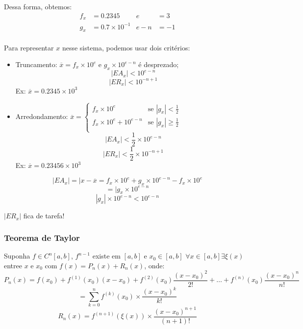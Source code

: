 \documentclass{article}
\begin{document}
            Dessa forma, obtemos:
            \begin{align*}
                f_x &= 0.2345               &               e &= 3\\
                g_x &= 0.7 \times 10^{-1}   &               e-n &= -1\\
            \end{align*}


            Para representar $x$ nesse sistema, podemos usar dois critérios:
            \begin{itemize}
                \item Truncamento: $\overline{x} = f_x \times 10^e$ e $g_x \times 10^{e-n}$ é desprezado;\\
                    \[|EA_x| < 10^{e-n}\]
                    \[|ER_x| < 10^{-n+1}\]
                    Ex: $\overline{x} = 0.2345 \times 10^3$
                \item Arredondamento: $\overline{x} = \begin{cases}
                        f_x  \times 10^e & \text{se $|g_x| < \frac{1}{2}$}\\
                        f_x  \times 10^e  + 10^{e - n} & \text{se $|g_x| \geq \frac{1}{2}$}\\
                    \end{cases}$\\
                    \[|EA_x| < \frac{1}{2} \times 10^{e-n}\]
                    \[|ER_x| < \frac{1}{2} \times 10^{-n+1}\]
                    Ex: $\overline{x} = 0.23456 \times 10^3$
            \end{itemize}

            \[|EA_x| = |x - \overline{x} = f_x \times 10^e + g_x \times 10^{e-n} - f_x \times 10^e\]
            \[= |g_x \times 10^{e-n}\]
            \[|g_x| \times 10^{e-n} < 10^{e-n}\]


            $|ER_x|$ fica de tarefa!

        \subsubsection{Teorema de Taylor}

            Suponha $f \in C^n[a,b]$, $f^{n-1}$ existe em $[a,b]$ e $x_0 \in [a,b]$
            $\forall x \in [a,b] \exists \xi(x)$ entree $x$ e $x_0$ com
            $f(x) = P_n(x) + R_n(x)$, onde:
            \[P_n(x) = f(x_0) + f^{(1)}(x_0)(x - x_0) + f^{(2)}(x_0)\frac{(x-x_0)^2}{2!} + \ldots + f^{(n)}(x_0)\frac{(x-x_0)^n}{n!}\]
            \[= \sum_{k=0}^{n} f^{(k)}(x_0) \times \frac{{(x - x_0)}^k}{k!}\]
            \[R_n(x) = f^{(n+1)}(\xi(x)) \times \frac{{(x - x_0)}^{n+1}}{(n + 1)!}\]
\end{document}
